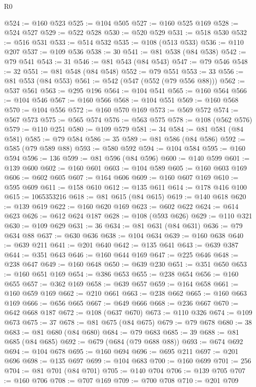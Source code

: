 \begin{lexlean}{R0}
\begin{coremodule}
@524 := @160 @523
@525 := @104 @505
@527 := @160 @525 @169
@528 := @524 @527
@529 := @522 @528
@530 := @520 @529
@531 := @518 @530
@532 := @516 @531
@533 := @514 @532
@535 := @108 (@513 @533)
@536 := @110 @207
@537 := @109 @536
@538 := 30
@541 := @81 @538 (@84 @538)
@542 := @79 @541
@543 := 31
@546 := @81 @543 (@84 @543)
@547 := @79 @546
@548 := 32
@551 := @81 @548 (@84 @548)
@552 := @79 @551
@553 := 33
@556 := @81 @553 (@84 @553)
@561 := @542 (@547 (@552 (@79 @556 @88)))
@562 := @537 @561
@563 := @295 @196
@564 := @104 @541
@565 := @160 @564
@566 := @104 @546
@567 := @160 @566
@568 := @104 @551
@569 := @160 @568
@570 := @104 @556
@572 := @160 @570 @169
@573 := @569 @572
@574 := @567 @573
@575 := @565 @574
@576 := @563 @575
@578 := @108 (@562 @576)
@579 := @110 @251
@580 := @109 @579
@581 := 34
@584 := @81 @581 (@84 @581)
@585 := @79 @584
@586 := 35
@589 := @81 @586 (@84 @586)
@592 := @585 (@79 @589 @88)
@593 := @580 @592
@594 := @104 @584
@595 := @160 @594
@596 := 136
@599 := @81 @596 (@84 @596)
@600 := @140 @599
@601 := @139 @600
@602 := @160 @601
@603 := @104 @589
@605 := @160 @603 @169
@606 := @602 @605
@607 := @164 @606
@609 := @160 @607 @169
@610 := @595 @609
@611 := @158 @610
@612 := @135 @611
@614 := @178 @416 @100
@615 := 1065353216
@618 := @81 @615 (@84 @615)
@619 := @140 @618
@620 := @139 @619
@622 := @160 @620 @169
@623 := @602 @622
@624 := @614 @623
@626 := @612 @624 @187
@628 := @108 (@593 @626)
@629 := @110 @321
@630 := @109 @629
@631 := 36
@634 := @81 @631 (@84 @631)
@636 := @79 @634 @88
@637 := @630 @636
@638 := @104 @634
@639 := @160 @638
@640 := @639 @211
@641 := @201 @640
@642 := @135 @641
@643 := @639 @387
@644 := @351 @643
@646 := @160 @644 @169
@647 := @225 @646
@648 := @238 @647
@649 := @160 @648
@650 := @639 @230
@651 := @351 @650
@653 := @160 @651 @169
@654 := @386 @653
@655 := @238 @654
@656 := @160 @655
@657 := @362 @169
@658 := @639 @657
@659 := @164 @658
@661 := @160 @659 @169
@662 := @210 @661
@663 := @238 @662
@665 := @160 @663 @169
@666 := @656 @665
@667 := @649 @666
@668 := @236 @667
@670 := @642 @668 @187
@672 := @108 (@637 @670)
@673 := @110 @326
@674 := @109 @673
@675 := 37
@678 := @81 @675 (@84 @675)
@679 := @79 @678
@680 := 38
@683 := @81 @680 (@84 @680)
@684 := @79 @683
@685 := 39
@688 := @81 @685 (@84 @685)
@692 := @679 (@684 (@79 @688 @88))
@693 := @674 @692
@694 := @104 @678
@695 := @160 @694
@696 := @695 @211
@697 := @201 @696
@698 := @135 @697
@699 := @104 @683
@700 := @160 @699
@701 := 256
@704 := @81 @701 (@84 @701)
@705 := @140 @704
@706 := @139 @705
@707 := @160 @706
@708 := @707 @169
@709 := @700 @708
@710 := @201 @709

\end{coremodule}
\end{lexlean}
